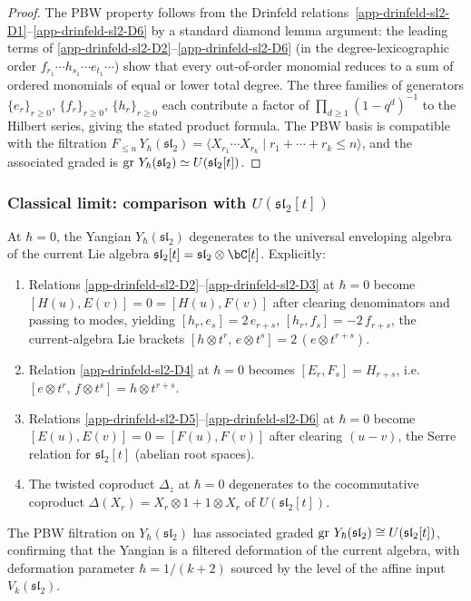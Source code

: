 \begin{proof}
The PBW property follows from the Drinfeld relations~\ref{app-drinfeld-sl2-D1}--\ref{app-drinfeld-sl2-D6}
by a standard diamond lemma argument: the leading terms of
\ref{app-drinfeld-sl2-D2}--\ref{app-drinfeld-sl2-D6} (in the degree-lexicographic order
$f_{r_1}\cdots h_{s_1}\cdots e_{t_1}\cdots$) show that every
out-of-order monomial reduces to a sum of ordered monomials of
equal or lower total degree. The three families of generators
$\{e_r\}_{r \ge 0}$, $\{f_r\}_{r \ge 0}$, $\{h_r\}_{r \ge 0}$
each contribute a factor of $\prod_{d \ge 1}(1-q^d)^{-1}$ to the
Hilbert series, giving the stated product formula. The PBW
basis is compatible with the filtration
$F_{\le n}\,Y_\hbar(\mathfrak{sl}_2) = \langle X_{r_1}\cdots X_{r_k}
\mid r_1 + \cdots + r_k \le n \rangle$, and the associated graded
is $\operatorname{gr}\,Y_\hbar(\mathfrak{sl}_2) \simeq U(\mathfrak{sl}_2[t])$.
\end{proof}

\subsubsection*{Classical limit: comparison with $U(\mathfrak{sl}_2[t])$}

\begin{theorem}
\ClaimStatusProvedHere
\label{thm:classical-limit-sl2}
At $\hbar = 0$, the Yangian $Y_\hbar(\mathfrak{sl}_2)$ degenerates to the
universal enveloping algebra of the current Lie algebra
$\mathfrak{sl}_2[t] = \mathfrak{sl}_2 \otimes \bC[t]$. Explicitly:
\begin{enumerate}[label=\textup{(\roman*)}]
\item Relations \ref{app-drinfeld-sl2-D2}--\ref{app-drinfeld-sl2-D3} at $\hbar = 0$ become
$[H(u), E(v)] = 0 = [H(u), F(v)]$ after clearing denominators
and passing to modes, yielding
$[h_r, e_s] = 2\,e_{r+s}$, $[h_r, f_s] = -2\,f_{r+s}$,
the current-algebra Lie brackets
$[h \otimes t^r,\, e \otimes t^s] = 2\,(e \otimes t^{r+s})$.
\item Relation \ref{app-drinfeld-sl2-D4} at $\hbar = 0$ becomes
$[E_r, F_s] = H_{r+s}$, i.e.\
$[e \otimes t^r,\, f \otimes t^s] = h \otimes t^{r+s}$.
\item Relations \ref{app-drinfeld-sl2-D5}--\ref{app-drinfeld-sl2-D6} at $\hbar = 0$ become
$[E(u),E(v)] = 0 = [F(u),F(v)]$ after clearing $(u{-}v)$,
the Serre relation for
$\mathfrak{sl}_2[t]$ (abelian root spaces).
\item The twisted coproduct $\Delta_z$ at $\hbar = 0$
degenerates to the cocommutative coproduct
$\Delta(X_r) = X_r \otimes 1 + 1 \otimes X_r$
of $U(\mathfrak{sl}_2[t])$.
\end{enumerate}
The PBW filtration on $Y_\hbar(\mathfrak{sl}_2)$ has associated graded
$\operatorname{gr}\,Y_\hbar(\mathfrak{sl}_2) \cong U(\mathfrak{sl}_2[t])$,
confirming that the Yangian is a filtered deformation of the current
algebra, with deformation parameter $\hbar = 1/(k+2)$ sourced by the
level of the affine input $V_k(\mathfrak{sl}_2)$.
\end{theorem}


